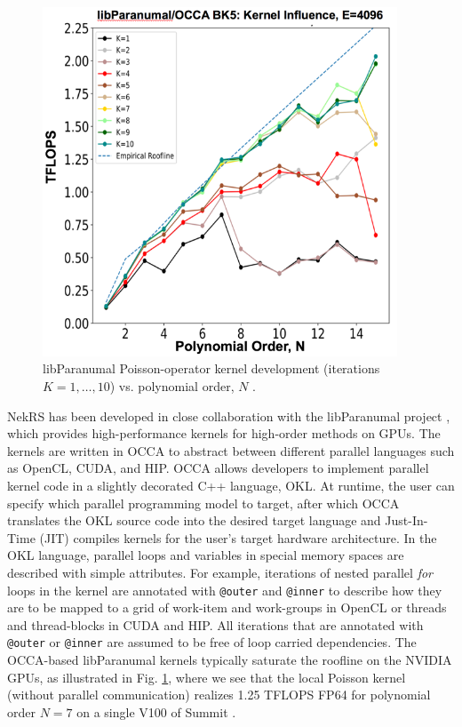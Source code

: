 \begin{figure}
\vspace{-0.8em}
\centering
\includegraphics[width=0.94\textwidth]{figs/libp_kernels.png}
\caption{\label{fig:roof}\small{
libParanumal Poisson-operator kernel development (iterations $K=1,\dots,10$) 
vs.  polynomial order, $N$   \cite{ceed_pb_paper_2020}.}}
\vspace{-0.8em}
\end{figure}
NekRS has been developed in close collaboration with the libParanumal project
\cite{warburton2019,ChalmersKarakusAustinSwirydowiczWarburton2020,streamParanumal2020},
which provides high-performance kernels for high-order methods on GPUs.  The
kernels are written in OCCA to abstract between different parallel languages
such as OpenCL, CUDA, and HIP. OCCA allows developers to implement parallel
kernel code in a slightly decorated C++ language, OKL.  At runtime, the user
can specify which parallel programming model to target, after which OCCA
translates the OKL source code into the desired target language and
Just-In-Time (JIT) compiles kernels for the user's target hardware
architecture.  In the OKL language, parallel loops and variables in special
memory spaces are described with simple attributes. For example, iterations of
nested parallel {\em for} loops in the kernel are annotated with
\texttt{@outer} and \texttt{@inner} to describe how they are to be mapped to a
grid of work-item and work-groups in OpenCL or threads and thread-blocks in
CUDA and HIP. All iterations that are annotated with \texttt{@outer} or
\texttt{@inner} are assumed to be free of loop carried dependencies. 
The OCCA-based libParanumal kernels
typically saturate the roofline on the NVIDIA GPUs, as illustrated
in Fig. \ref{fig:roof}, where we see that the local Poisson kernel
(without parallel communication) realizes 1.25 TFLOPS FP64 for polynomial
order $N=7$ on a single V100 of Summit \cite{ceed_bp_paper_2020}.





